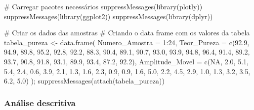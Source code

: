 \documentclass[
  letterpaper,
  DIV=11,
  numbers=noendperiod]{scrartcl}
\newenvironment{Shaded}{\begin{snugshade}}{\end{snugshade}}
\newcommand{\AttributeTok}[1]{\textcolor[rgb]{0.40,0.45,0.13}{#1}}
\newcommand{\CommentTok}[1]{\textcolor[rgb]{0.37,0.37,0.37}{#1}}
\newcommand{\ConstantTok}[1]{\textcolor[rgb]{0.56,0.35,0.01}{#1}}
\newcommand{\DecValTok}[1]{\textcolor[rgb]{0.68,0.00,0.00}{#1}}
\newcommand{\FloatTok}[1]{\textcolor[rgb]{0.68,0.00,0.00}{#1}}
\newcommand{\FunctionTok}[1]{\textcolor[rgb]{0.28,0.35,0.67}{#1}}
\newcommand{\NormalTok}[1]{\textcolor[rgb]{0.00,0.23,0.31}{#1}}
\newcommand{\OtherTok}[1]{\textcolor[rgb]{0.00,0.23,0.31}{#1}}
\newcommand{\SpecialCharTok}[1]{\textcolor[rgb]{0.37,0.37,0.37}{#1}}
\begin{document}
\begin{Shaded}
\begin{Highlighting}[]
\CommentTok{\# Carregar pacotes necessários}
\FunctionTok{suppressMessages}\NormalTok{(}\FunctionTok{library}\NormalTok{(plotly))}
\FunctionTok{suppressMessages}\NormalTok{(}\FunctionTok{library}\NormalTok{(ggplot2))}
\FunctionTok{suppressMessages}\NormalTok{(}\FunctionTok{library}\NormalTok{(dplyr))}

\CommentTok{\# Criar os dados das amostras}
 \CommentTok{\# Criando o data frame com os valores da tabela}
\NormalTok{tabela\_pureza }\OtherTok{\textless{}{-}} \FunctionTok{data.frame}\NormalTok{(}
  \AttributeTok{Numero\_Amostra =} \DecValTok{1}\SpecialCharTok{:}\DecValTok{24}\NormalTok{,}
  \AttributeTok{Teor\_Pureza =} \FunctionTok{c}\NormalTok{(}\FloatTok{92.9}\NormalTok{, }\FloatTok{94.9}\NormalTok{, }\FloatTok{89.8}\NormalTok{, }\FloatTok{95.2}\NormalTok{, }\FloatTok{92.8}\NormalTok{, }\FloatTok{92.2}\NormalTok{, }\FloatTok{88.3}\NormalTok{, }\FloatTok{90.4}\NormalTok{, }\FloatTok{89.1}\NormalTok{, }\FloatTok{90.7}\NormalTok{, }
                  \FloatTok{93.0}\NormalTok{, }\FloatTok{93.9}\NormalTok{, }\FloatTok{94.8}\NormalTok{, }\FloatTok{96.4}\NormalTok{, }\FloatTok{91.4}\NormalTok{, }\FloatTok{89.2}\NormalTok{, }\FloatTok{93.7}\NormalTok{, }\FloatTok{90.8}\NormalTok{, }\FloatTok{91.8}\NormalTok{, }\FloatTok{93.1}\NormalTok{, }
                  \FloatTok{89.9}\NormalTok{, }\FloatTok{93.4}\NormalTok{, }\FloatTok{87.2}\NormalTok{, }\FloatTok{92.2}\NormalTok{),}
  \AttributeTok{Amplitude\_Movel =} \FunctionTok{c}\NormalTok{(}\ConstantTok{NA}\NormalTok{, }\FloatTok{2.0}\NormalTok{, }\FloatTok{5.1}\NormalTok{, }\FloatTok{5.4}\NormalTok{, }\FloatTok{2.4}\NormalTok{, }\FloatTok{0.6}\NormalTok{, }\FloatTok{3.9}\NormalTok{, }\FloatTok{2.1}\NormalTok{, }\FloatTok{1.3}\NormalTok{, }\FloatTok{1.6}\NormalTok{, }
                      \FloatTok{2.3}\NormalTok{, }\FloatTok{0.9}\NormalTok{, }\FloatTok{0.9}\NormalTok{, }\FloatTok{1.6}\NormalTok{, }\FloatTok{5.0}\NormalTok{, }\FloatTok{2.2}\NormalTok{, }\FloatTok{4.5}\NormalTok{, }\FloatTok{2.9}\NormalTok{, }\FloatTok{1.0}\NormalTok{, }\FloatTok{1.3}\NormalTok{, }
                      \FloatTok{3.2}\NormalTok{, }\FloatTok{3.5}\NormalTok{, }\FloatTok{6.2}\NormalTok{, }\FloatTok{5.0}\NormalTok{)}
\NormalTok{); }\FunctionTok{suppressMessages}\NormalTok{(}\FunctionTok{attach}\NormalTok{(tabela\_pureza))}
\end{Highlighting}
\end{Shaded}

\subsubsection{Análise descritiva}\label{anuxe1lise-descritiva}
\end{document}
